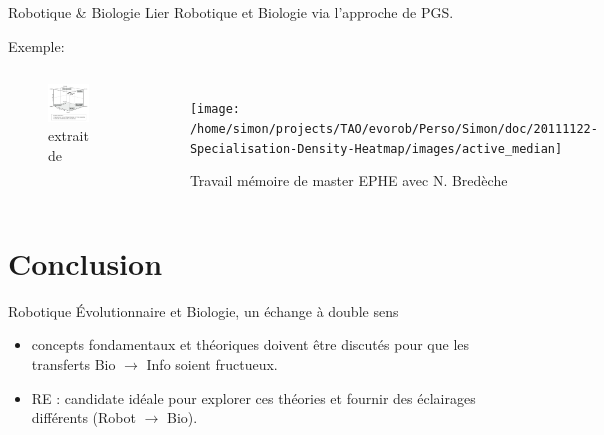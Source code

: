 \documentclass[8pt, handout=show,notes=show]{beamer}
\begin{document}
\begin{frame}{Robotique \& Biologie}
	Lier Robotique et Biologie via l'approche de PGS.
	\vfill

	Exemple:
	\begin{columns}
		\begin{figure}[h]
			\begin{center}
				\includegraphics[width=4cm]{./images/PGS.png}
			\end{center}
			\caption{extrait de \citet[p.~64]{godfrey2009darwinian}}
		\end{figure}
		\begin{figure}[h]
			\begin{center}
				\texttt{[image: /home/simon/projects/TAO/evorob/Perso/Simon/doc/20111122-Specialisation-Density-Heatmap/images/active\_median]}
			\end{center}
			\caption{Travail mémoire de master EPHE avec N. Bredèche}
		\end{figure}
	\end{columns}

\end{frame}





\section{Conclusion}

\begin{frame}{Robotique \'Evolutionnaire et Biologie, un échange à double sens}
	\begin{itemize}
		\item concepts fondamentaux et théoriques doivent être discutés pour que les transferts Bio $\rightarrow$ Info soient fructueux.
			\vfill
		\item RE : candidate idéale pour explorer ces théories et fournir des éclairages différents (Robot $\rightarrow$ Bio).
	\end{itemize}

\end{frame}





\end{document}
